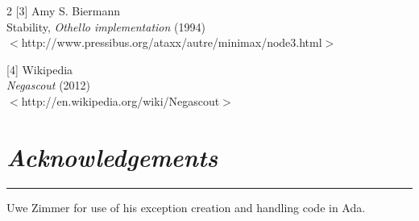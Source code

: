 \documentclass[10pt]{report}
\begin{document}
\begin{multicols}{2}
[3]
Amy S. Biermann\\
Stability, \emph{Othello implementation} (1994)\\
$<$http://www.pressibus.org/ataxx/autre/minimax/node3.html$>$

[4]
Wikipedia\\
\emph{Negascout} (2012)\\
$<$http://en.wikipedia.org/wiki/Negascout$>$

\section*{\emph{\textmd{Acknowledgements}}}
\hrule
\vspace{0.4cm}

Uwe Zimmer for use of his exception creation and handling code in Ada.
\end{multicols}
\end{document}
